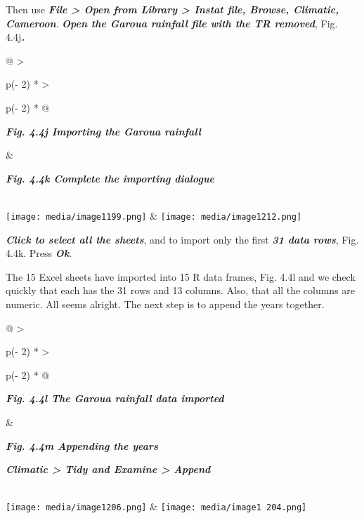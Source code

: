 \documentclass[
  letterpaper,
  DIV=11,
  numbers=noendperiod]{scrreprt}
\begin{document}
Then use \textbf{\emph{File \textgreater{} Open from Library
\textgreater{} Instat file, Browse, Climatic, Cameroon}}.
\textbf{\emph{Open the Garoua rainfall file with the TR removed}}, Fig.
4.4j\textbf{\emph{.}}

\begin{longtable}[]{@{}
  >{\raggedright\arraybackslash}p{(\columnwidth - 2\tabcolsep) * }
  >{\raggedright\arraybackslash}p{(\columnwidth - 2\tabcolsep) * }@{}}
\toprule\noalign{}
\begin{minipage}[b]{\linewidth}\raggedright
\textbf{\emph{Fig. 4.4j Importing the Garoua rainfall}}
\end{minipage} & \begin{minipage}[b]{\linewidth}\raggedright
\textbf{\emph{Fig. 4.4k Complete the importing dialogue}}
\end{minipage} \\
\midrule\noalign{}
\endhead
\bottomrule\noalign{}
\endlastfoot
\texttt{[image: media/image1199.png]}
&
\texttt{[image: media/image1212.png]} \\
\end{longtable}

\textbf{\emph{Click to select all the sheets}}, and to import only the
first \textbf{\emph{31 data rows}}, Fig. 4.4k. Press \textbf{\emph{Ok}}.

The 15 Excel sheets have imported into 15 R data frames, Fig. 4.4l and
we check quickly that each has the 31 rows and 13 columns. Also, that
all the columns are numeric. All seems alright. The next step is to
append the years together.

\begin{longtable}[]{@{}
  >{\raggedright\arraybackslash}p{(\columnwidth - 2\tabcolsep) * }
  >{\raggedright\arraybackslash}p{(\columnwidth - 2\tabcolsep) * }@{}}
\toprule\noalign{}
\begin{minipage}[b]{\linewidth}\raggedright
\textbf{\emph{Fig. 4.4l The Garoua rainfall data imported}}
\end{minipage} & \begin{minipage}[b]{\linewidth}\raggedright
\textbf{\emph{Fig. 4.4m Appending the years}}

\textbf{\emph{Climatic \textgreater{} Tidy and Examine \textgreater{}
Append}}
\end{minipage} \\
\midrule\noalign{}
\endhead
\bottomrule\noalign{}
\endlastfoot
\texttt{[image: media/image1206.png]}
&
\texttt{[image: media/image1 204.png]} \\
\end{longtable}
\end{document}
